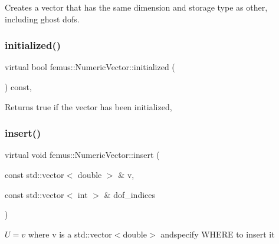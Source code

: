 Creates a vector that has the same dimension and storage type as {\ttfamily other}, including ghost dofs. \mbox{\label{classfemus_1_1_numeric_vector_a26d8ccf5f86fae43264918ce337488b7}} 
\subsubsection{\texorpdfstring{initialized()}{initialized()}}
{\footnotesize\ttfamily virtual bool femus\+::\+Numeric\+Vector\+::initialized (\begin{DoxyParamCaption}{ }\end{DoxyParamCaption}) const\hspace{0.3cm}{\ttfamily [inline]}, {\ttfamily [virtual]}}

\begin{DoxyReturn}{Returns}
true if the vector has been initialized, 
\end{DoxyReturn}
\mbox{\label{classfemus_1_1_numeric_vector_a96f696c38f27d57cf58bfb0fac9d9f6f}} 
\subsubsection{\texorpdfstring{insert()}{insert()}\hspace{0.1cm}{\footnotesize\ttfamily [1/4]}}
{\footnotesize\ttfamily virtual void femus\+::\+Numeric\+Vector\+::insert (\begin{DoxyParamCaption}\item[{const std\+::vector$<$ double $>$ \&}]{v,  }\item[{const std\+::vector$<$ int $>$ \&}]{dof\+\_\+indices }\end{DoxyParamCaption})\hspace{0.3cm}{\ttfamily [pure virtual]}}



$ U=v $ where v is a std\+::vector$<$double$>$ andspecify W\+H\+E\+RE to insert it 

\mbox{\label{classfemus_1_1_numeric_vector_a993c202d43f23f0e81d74b635cc5c3ba}} 
